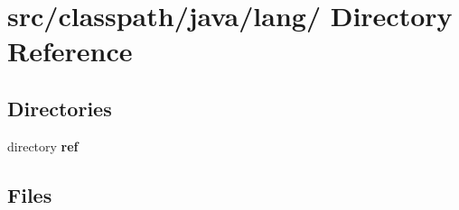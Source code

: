 \section{src/classpath/java/lang/ Directory Reference}
\label{dir_07e7f3a18c6acb59288b934477bcd3e6}
\subsection*{Directories}
\begin{DoxyCompactItemize}
\item 
directory {\bf ref}
\end{DoxyCompactItemize}
\subsection*{Files}
